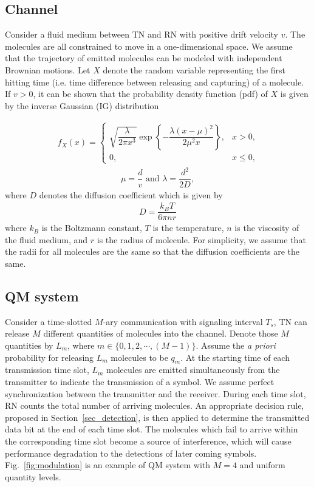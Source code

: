 \subsection{Channel}
Consider a fluid medium between TN and RN with positive drift velocity $v$. The molecules are all constrained to move in a one-dimensional space. We assume that the trajectory of emitted molecules can be modeled with independent Brownian motions\cite{brown}.
Let $X$ denote the random variable representing the first hitting time (i.e. time difference between releasing and capturing) of a molecule. If $v > 0$, it can be shown that the probability density function (pdf) of $X$ is given by the inverse Gaussian (IG) distribution \cite{Chhikara:1989:IGD:73944}

\begin{eqnarray}
f_X(x) = \left\{\begin{array}{ll}
                 \sqrt{\dfrac{\lambda}{2\pi x^3}}\exp \left\{ -\dfrac{\lambda (x-\mu)^2}{2\mu^2 x} \right\}, & \mbox{$x>0$,}
                 \\
                 0, & \mbox{$x \leq 0$,}
                \end{array} \right. \label{IG_PDF}
\end{eqnarray}
\begin{eqnarray}
\mu = \dfrac{d}{v}\text{\ and\ } \lambda = \dfrac{d^2}{2D},\nonumber
\end{eqnarray}
where $D$ denotes the diffusion coefficient which is given by
\begin{eqnarray}
D = \dfrac{k_BT}{6\pi n r} \nonumber
\end{eqnarray}
where $k_B$ is the Boltzmann constant, $T$ is the temperature, $n$ is the viscosity of the fluid medium, and $r$ is the radius of molecule. For simplicity,
 we assume that the radii for all molecules are the same so that the diffusion coefficients are the same.

\subsection{QM system}
 Consider a time-slotted $M$-ary communication with signaling interval $T_s$, TN can release $M$ different quantities of molecules into the channel. Denote those $M$ quantities by $L_m$, where $m \in \{ 0,1,2,\cdots ,(M-1)\}$. Assume the \emph{a priori} probability for releasing $L_m$ molecules to be $q_m$. At the starting time of each transmission time slot, $L_m$ molecules are emitted simultaneously from the transmitter to indicate the transmission of a symbol. We assume perfect synchronization between the transmitter and the receiver. During each time slot, RN counts the total number of arriving molecules. An appropriate decision rule, proposed in Section~\ref{sec_detection}, is then applied to determine the transmitted data bit at the end of each time slot. The molecules which fail to arrive within the corresponding time slot become a source of interference, which will cause performance degradation to the detections of later coming symbols. Fig.~\ref{fig:modulation} is an example of QM system with $M=4$ and uniform quantity levels.


